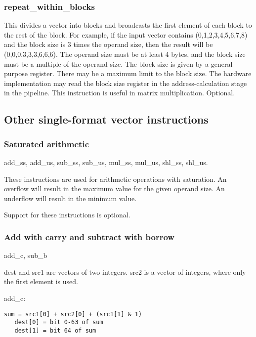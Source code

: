 \documentclass[forwardcom.tex]{subfiles}
\begin{document}
\subsubsection{repeat\_within\_blocks}
This divides a vector into blocks and broadcasts the first element of each block to the rest of the block. For example, if the input vector contains (0,1,2,3,4,5,6,7,8) and the block size is 3 times the operand size, then the result will be (0,0,0,3,3,3,6,6,6).
The operand size must be at least 4 bytes, and the block size must be a multiple of the operand size. The block size is given by a general purpose register. There may be a maximum limit to the block size. The hardware implementation may read the block size register in the address-calculation stage in the pipeline. This instruction is useful in matrix multiplication. Optional.

\subsection{Other single-format vector instructions}

\subsubsection{Saturated arithmetic} \label{saturatedArithmeticInstructions}
add\_ss, add\_us, sub\_ss, sub\_us, mul\_ss, mul\_us, shl\_ss, shl\_us.
\vspace{2mm}

These instructions are used for arithmetic operations with saturation. An overflow will result in the maximum value for the given operand size. An underflow will result in the minimum value.
\vspace{2mm}

Support for these instructions is optional.

\subsubsection{Add with carry and subtract with borrow} \label{addWithCarryInstruction}
add\_c, sub\_b
\vspace{2mm}

dest and src1 are vectors of two integers. src2 is a vector of integers, where only the first element is used.
\vspace{2mm}

add\_c: 
\begin{lstlisting}[frame=none]
   sum = src1[0] + src2[0] + (src1[1] & 1)
   dest[0] = bit 0-63 of sum 
   dest[1] = bit 64 of sum
\end{lstlisting}
\end{document}
